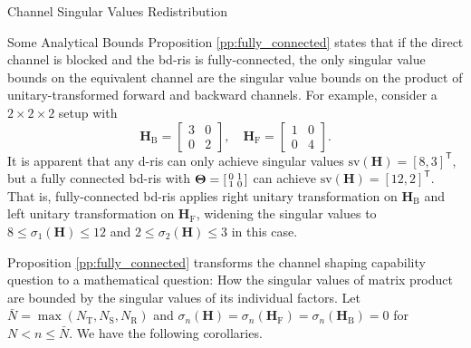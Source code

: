 \documentclass[journal]{IEEEtran}
\begin{document}
\begin{section}{Channel Singular Values Redistribution}
\begin{subsection}{Some Analytical Bounds}
		Proposition \ref{pp:fully_connected} states that if the direct channel is blocked and the \gls{bd}-\gls{ris} is fully-connected, the only singular value bounds on the equivalent channel are the singular value bounds on the product of unitary-transformed forward and backward channels.
		For example, consider a $2 \times 2 \times 2$ setup with
		\begin{equation*}
			\mathbf{H}_\mathrm{B} =
				\begin{bmatrix}
					3 & 0 \\
					0 & 2
				\end{bmatrix},
				\quad
				\mathbf{H}_\mathrm{F} =
				\begin{bmatrix}
					1 & 0 \\
					0 & 4
				\end{bmatrix}.
		\end{equation*}
		It is apparent that any \gls{d}-\gls{ris} can only achieve singular values $\mathrm{sv}(\mathbf{H}) = [8, 3]^\mathsf{T}$, but a fully connected \gls{bd}-\gls{ris} with $\mathbf{\Theta} = \begin{bsmallmatrix} 0 & 1 \\ 1 & 0 \end{bsmallmatrix}$ can achieve $\mathrm{sv}(\mathbf{H}) = [12, 2]^\mathsf{T}$.
		That is, fully-connected \gls{bd}-\gls{ris} applies right unitary transformation on $\mathbf{H}_\mathrm{B}$ and left unitary transformation on $\mathbf{H}_\mathrm{F}$, widening the singular values to $8 \le \sigma_1(\mathbf{H}) \le 12$ and $2 \le \sigma_2(\mathbf{H}) \le 3$ in this case.

		Proposition \ref{pp:fully_connected} transforms the channel shaping capability question to a mathematical question: How the singular values of matrix product are bounded by the singular values of its individual factors.
		Let $\bar{N} = \max(N_\mathrm{T},N_\mathrm{S},N_\mathrm{R})$ and $\sigma_n(\mathbf{H})=\sigma_n(\mathbf{H}_\mathrm{F})=\sigma_n(\mathbf{H}_\mathrm{B})=0$ for $N < n \le \bar{N}$.
		We have the following corollaries.


\end{subsection}
\end{section}
\end{document}
